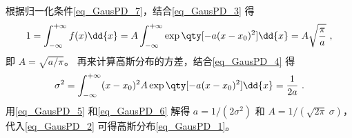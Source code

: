 根据归一化条件\autoref{eq_GausPD_7}，结合\autoref{eq_GausPD_3} 得
\begin{equation}\label{eq_GausPD_5}
1 = \int_{-\infty}^{+\infty} f(x) \dd{x}  = A\int_{-\infty}^{+\infty} \exp\qty[-a (x - x_0)^2] \dd{x}  = A\sqrt{\frac{\pi}{a}}~,
\end{equation}
即 $A = \sqrt{a/\pi}$。 再来计算高斯分布的方差，结合\autoref{eq_GausPD_4} 得
\begin{equation}\label{eq_GausPD_6}
\sigma ^2 = \int_{-\infty}^{+\infty} (x - x_0)^2 A\exp\qty[-a (x - x_0)^2] \dd{x}  = \frac{1}{2a}~.
\end{equation}
用\autoref{eq_GausPD_5} 和\autoref{eq_GausPD_6} 解得 $a = 1/(2\sigma^2)$ 和 $A = 1/(\sqrt{2\pi}\ \sigma)$，代入\autoref{eq_GausPD_2} 可得高斯分布\autoref{eq_GausPD_1}。
